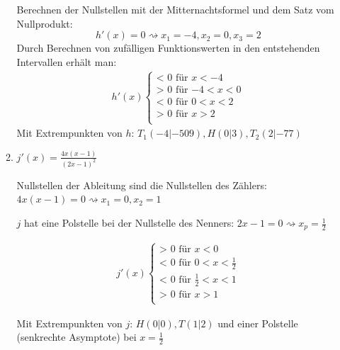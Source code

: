 \begin{lsg}{}
\begin{enumerate}
\begin{enumerate}
			Berechnen der Nullstellen mit der Mitternachtsformel und dem Satz vom Nullprodukt:
			\begin{equation*}
				h'(x)=0 \rightsquigarrow x_1=-4, x_2=0, x_3=2
			\end{equation*}
			Durch Berechnen von zufälligen Funktionswerten in den entstehenden Intervallen erhält man:
			\begin{align*}
				h'(x) \begin{cases}
					\text{< 0 für $x<-4$}\\
					\text{> 0 für $-4<x<0$}\\
					\text{< 0 für $0<x<2$}\\
					\text{> 0 für $x>2$}\\
				\end{cases}
			\end{align*}
			Mit Extrempunkten von $h$: $T_1(-4|-509), H(0|3), T_2(2|-77)$
			\item $j'(x)=\frac{4x(x-1)}{(2x-1)^2}$

			Nullstellen der Ableitung sind die Nullstellen des Zählers:
			$4x(x-1)=0 \rightsquigarrow x_1=0, x_2=1$

			$j$ hat eine Polstelle bei der Nullstelle des Nenners:
			$2x-1=0 \rightsquigarrow x_p=\frac 1 2$

			\begin{align*}
				j'(x) \begin{cases}
					\text{> 0 für $x<0$}\\
					\text{< 0 für $0<x<\frac 1 2$}\\
					\text{< 0 für $\frac 1 2<x<1$}\\
					\text{> 0 für $x>1$}\\
				\end{cases}
			\end{align*}

			Mit Extrempunkten von $j$: $H(0|0), T(1|2)$ und einer Polstelle (senkrechte Asymptote) bei $x=\frac 1 2$
		\end{enumerate}
	\end{enumerate}
\end{lsg}



